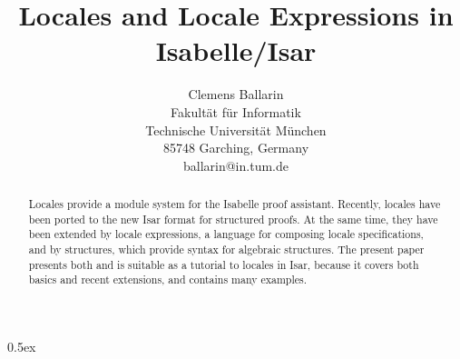 \documentclass[leqno]{article}
\begin{document}
\title{Locales and Locale Expressions in Isabelle/Isar}
\author{Clemens Ballarin \\
  Fakult\"at f\"ur Informatik \\ Technische Universit\"at M\"unchen \\
  85748 Garching, Germany \\
  ballarin@in.tum.de}
\date{}

\maketitle

\begin{abstract}
  Locales provide a module system for the Isabelle proof assistant.
  Recently, locales have been ported to the new Isar format for
  structured proofs.  At the same time, they have been extended by
  locale expressions, a language for composing locale specifications,
  and by structures, which provide syntax for algebraic structures.
  The present paper presents both and is suitable as a tutorial to
  locales in Isar, because it covers both basics and recent
  extensions, and contains many examples.
\end{abstract}


\parindent 0pt\parskip 0.5ex





\end{document}
